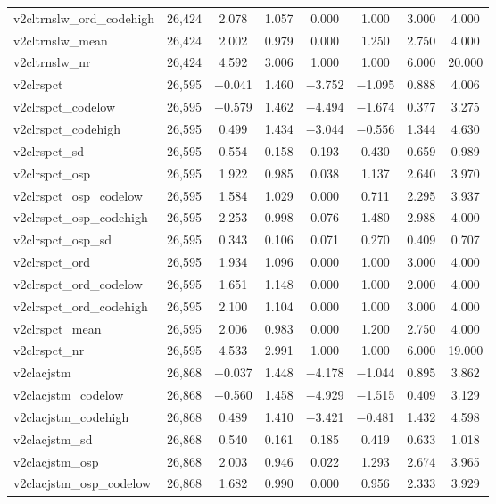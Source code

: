 \begin{table}[!htbp]
\begin{tabular}{@{\extracolsep{5pt}}lccccccc}
v2cltrnslw\_ord\_codehigh & 26,424 & 2.078 & 1.057 & 0.000 & 1.000 & 3.000 & 4.000 \\ 
v2cltrnslw\_mean & 26,424 & 2.002 & 0.979 & 0.000 & 1.250 & 2.750 & 4.000 \\ 
v2cltrnslw\_nr & 26,424 & 4.592 & 3.006 & 1.000 & 1.000 & 6.000 & 20.000 \\ 
v2clrspct & 26,595 & $-$0.041 & 1.460 & $-$3.752 & $-$1.095 & 0.888 & 4.006 \\ 
v2clrspct\_codelow & 26,595 & $-$0.579 & 1.462 & $-$4.494 & $-$1.674 & 0.377 & 3.275 \\ 
v2clrspct\_codehigh & 26,595 & 0.499 & 1.434 & $-$3.044 & $-$0.556 & 1.344 & 4.630 \\ 
v2clrspct\_sd & 26,595 & 0.554 & 0.158 & 0.193 & 0.430 & 0.659 & 0.989 \\ 
v2clrspct\_osp & 26,595 & 1.922 & 0.985 & 0.038 & 1.137 & 2.640 & 3.970 \\ 
v2clrspct\_osp\_codelow & 26,595 & 1.584 & 1.029 & 0.000 & 0.711 & 2.295 & 3.937 \\ 
v2clrspct\_osp\_codehigh & 26,595 & 2.253 & 0.998 & 0.076 & 1.480 & 2.988 & 4.000 \\ 
v2clrspct\_osp\_sd & 26,595 & 0.343 & 0.106 & 0.071 & 0.270 & 0.409 & 0.707 \\ 
v2clrspct\_ord & 26,595 & 1.934 & 1.096 & 0.000 & 1.000 & 3.000 & 4.000 \\ 
v2clrspct\_ord\_codelow & 26,595 & 1.651 & 1.148 & 0.000 & 1.000 & 2.000 & 4.000 \\ 
v2clrspct\_ord\_codehigh & 26,595 & 2.100 & 1.104 & 0.000 & 1.000 & 3.000 & 4.000 \\ 
v2clrspct\_mean & 26,595 & 2.006 & 0.983 & 0.000 & 1.200 & 2.750 & 4.000 \\ 
v2clrspct\_nr & 26,595 & 4.533 & 2.991 & 1.000 & 1.000 & 6.000 & 19.000 \\ 
v2clacjstm & 26,868 & $-$0.037 & 1.448 & $-$4.178 & $-$1.044 & 0.895 & 3.862 \\ 
v2clacjstm\_codelow & 26,868 & $-$0.560 & 1.458 & $-$4.929 & $-$1.515 & 0.409 & 3.129 \\ 
v2clacjstm\_codehigh & 26,868 & 0.489 & 1.410 & $-$3.421 & $-$0.481 & 1.432 & 4.598 \\ 
v2clacjstm\_sd & 26,868 & 0.540 & 0.161 & 0.185 & 0.419 & 0.633 & 1.018 \\ 
v2clacjstm\_osp & 26,868 & 2.003 & 0.946 & 0.022 & 1.293 & 2.674 & 3.965 \\ 
v2clacjstm\_osp\_codelow & 26,868 & 1.682 & 0.990 & 0.000 & 0.956 & 2.333 & 3.929 \\ 

\end{tabular}
\end{table}
